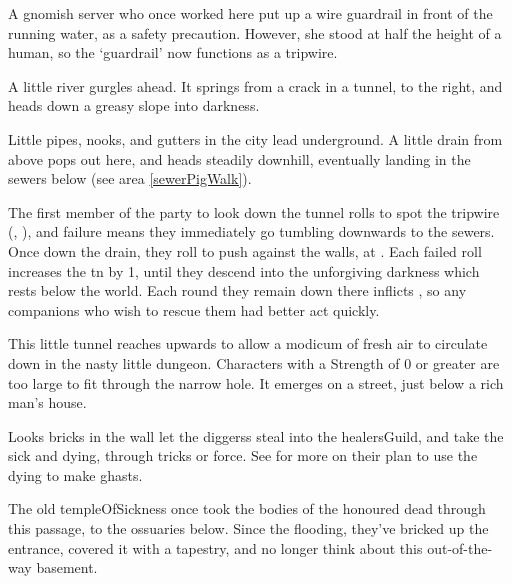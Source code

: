 \begin{multicols}{2}

\begin{exampletext}
  A gnomish \gls{server} who once worked here put up a wire guardrail in front of the running water, as a safety precaution.
  However, she stood at half the height of a human, so the `guardrail' now functions as a tripwire.
\end{exampletext}

\begin{boxtext}
  A little river gurgles ahead.
  It springs from a crack in a tunnel, to the right, and heads down a greasy slope into darkness.
\end{boxtext}

Little pipes, nooks, and gutters in the city lead underground.
A little drain from above pops out here, and heads steadily downhill, eventually landing in the sewers below (see area \vref{sewerPigWalk}).

The first member of the party to look down the tunnel rolls to spot the tripwire (, \tn[8]), and failure means they immediately go tumbling downwards to the sewers.
Once down the drain, they roll  to push against the walls, at \tn[9].
Each failed roll increases the \gls{tn} by 1, until they descend into the unforgiving darkness which rests below the world.
Each round they remain down there inflicts , so any companions who wish to rescue them had better act quickly.


This little tunnel reaches upwards to allow a modicum of fresh air to circulate down in the nasty little dungeon.
Characters with a Strength of 0 or greater are too large to fit through the narrow hole.
It emerges on a street, just below a rich man's house.


Looks bricks in the wall let the \glspl{diggers} steal into the \gls{healersGuild}, and take the sick and dying, through tricks or force.
See  for more on their plan to use the dying to make ghasts.

\begin{exampletext}
  The old \gls{templeOfSickness} once took the bodies of the honoured dead through this passage, to the ossuaries below.
  Since the flooding, they've bricked up the entrance, covered it with a tapestry, and no longer think about this out-of-the-way basement.


\end{exampletext}
\end{multicols}

